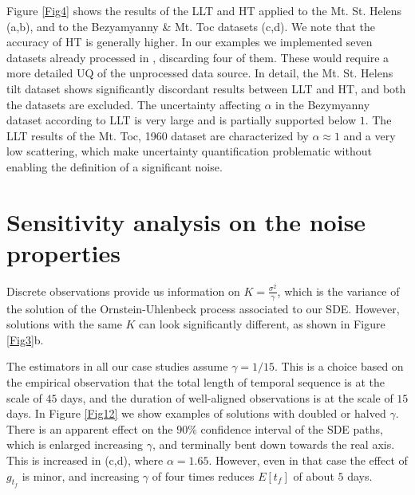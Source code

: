 \documentclass{article}
\begin{document}
Figure \ref{Fig4} shows the results of the LLT and HT applied to the Mt. St. Helens (a,b), and to the Bezyamyanny \& Mt. Toc datasets (c,d). We note that the accuracy of HT is generally higher. In our examples we implemented seven datasets already processed in \cite{Voight1988}, discarding four of them. These would require a more detailed UQ of the unprocessed data source. In detail, the Mt. St. Helens tilt dataset shows significantly discordant results between LLT and HT, and both the datasets are excluded. The uncertainty affecting $\alpha$ in the Bezymyanny dataset according to LLT is very large and is partially supported below $1$. The LLT results of the Mt. Toc, 1960 dataset are characterized by $\alpha\approx 1$ and a very low scattering, which make uncertainty quantification problematic without enabling the definition of a significant noise.

\section{Sensitivity analysis on the noise properties}\label{A-2}
Discrete observations provide us information on $K=\frac{\sigma^2}{\gamma}$, which is the variance of the solution of the Ornstein-Uhlenbeck process associated to our SDE. However, solutions with the same $K$ can look significantly different, as shown in Figure \ref{Fig3}b.

The estimators in all our case studies assume $\gamma=1/15$.  This is a choice based on the empirical observation that the total length of temporal sequence is at the scale of $45$ days, and the duration of well-aligned observations is at the scale of $15$ days. In Figure \ref{Fig12} we show examples of solutions with doubled or halved $\gamma$. There is an apparent effect on the $90\%$ confidence interval of the SDE paths, which is enlarged increasing $\gamma$, and terminally bent down towards the real axis. This is increased in (c,d), where $\alpha=1.65$. However, even in that case the effect of $g_{t_f}$ is minor, and increasing $\gamma$ of four times reduces $E[t_f]$ of about $5$ days.



\end{document}
